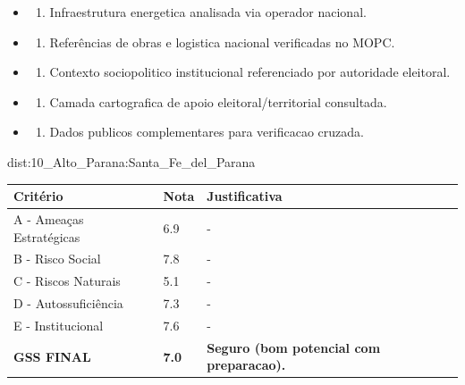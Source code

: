 {\begin{itemize}
\item
  \begin{enumerate}
  \def\labelenumi{\arabic{enumi})}
  \setcounter{enumi}{7}
  \tightlist
  \item
    Infraestrutura energetica analisada via operador nacional.
  \end{enumerate}
\item
  \begin{enumerate}
  \def\labelenumi{\arabic{enumi})}
  \setcounter{enumi}{8}
  \tightlist
  \item
    Referências de obras e logistica nacional verificadas no MOPC.
  \end{enumerate}
\item
  \begin{enumerate}
  \def\labelenumi{\arabic{enumi})}
  \setcounter{enumi}{9}
  \tightlist
  \item
    Contexto sociopolitico institucional referenciado por autoridade
    eleitoral.
  \end{enumerate}
\item
  \begin{enumerate}
  \def\labelenumi{\arabic{enumi})}
  \setcounter{enumi}{10}
  \tightlist
  \item
    Camada cartografica de apoio eleitoral/\allowbreak territorial consultada.
  \end{enumerate}
\item
  \begin{enumerate}
  \def\labelenumi{\arabic{enumi})}
  \setcounter{enumi}{11}
  \tightlist
  \item
    Dados publicos complementares para verificacao cruzada.
  \end{enumerate}
\end{itemize}}{dist:10_Alto_Parana:Santa_Fe_del_Parana}
\begin{table}[ht!]
\small \begin{tabular}{p{3.0cm}p{0.8cm}p{6.0cm}} \toprule
\textbf{Critério} & \textbf{Nota} & \textbf{Justificativa} \\ \midrule
A - Ameaças Estratégicas & 6.9 & - \\
B - Risco Social & 7.8 & - \\
C - Riscos Naturais & 5.1 & - \\
D - Autossuficiência & 7.3 & - \\
E - Institucional & 7.6 & - \\
\midrule \textbf{GSS FINAL} & \textbf{7.0} & \textbf{Seguro (bom potencial com preparacao).} \\ \bottomrule \end{tabular}
\end{table}
